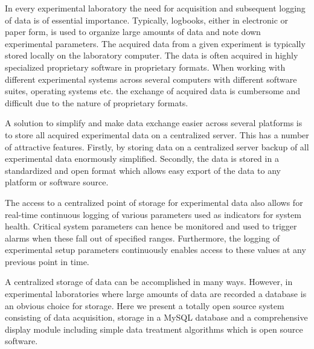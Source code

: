 In every experimental laboratory the need for acquisition and subsequent
logging of data is of essential importance. Typically, logbooks, either in
electronic or paper form, is used to organize large amounts of data and note
down experimental parameters. The acquired data from a given experiment is
typically stored locally on the laboratory computer. The data is often acquired
in highly specialized proprietary software in proprietary formats. When working
with different experimental systems across several computers with different
software suites, operating systems etc. the exchange of acquired data is
cumbersome and difficult due to the nature of proprietary formats.

A solution to simplify and make data exchange easier across several platforms
is to store all acquired experimental data on a centralized server. This has a
number of attractive features. Firstly, by storing data on a centralized server
backup of all experimental data enormously simplified. Secondly, the data is
stored in a standardized and open format which allows easy export of the data
to any platform or software source.

The access to a centralized point of storage for experimental data also allows
for real-time continuous logging of various parameters used as indicators for
system health. Critical system parameters can hence be monitored and used to
trigger alarms when these fall out of specified ranges. Furthermore, the
logging of experimental setup parameters continuously enables access to these
values at any previous point in time.

A centralized storage of data can be accomplished in many ways. However, in
experimental laboratories where large amounts of data are recorded a database
is an obvious choice for storage. Here we present a totally open source system
consisting of data acquisition, storage in a MySQL database and a comprehensive
display module including simple data treatment algorithms which is open source
software.

